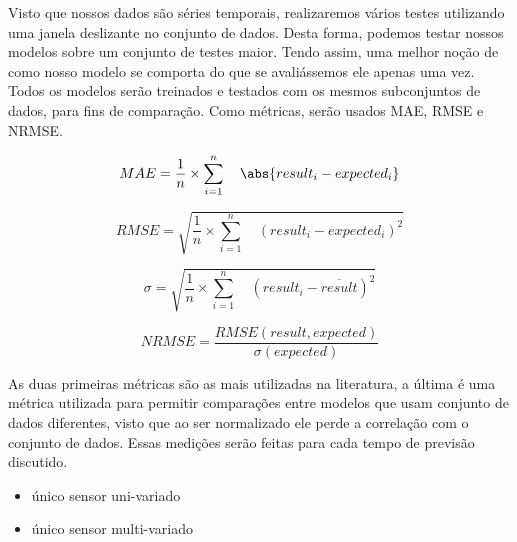 



Visto que nossos dados são séries temporais, realizaremos vários testes utilizando uma janela deslizante no conjunto de dados. Desta forma, podemos testar nossos modelos sobre um conjunto de testes maior. Tendo assim, uma melhor noção de como nosso modelo se comporta do que se avaliássemos ele apenas uma vez. Todos os modelos serão treinados e testados com os mesmos subconjuntos de dados, para fins de comparação. Como métricas, serão usados MAE, RMSE e NRMSE. 

\begin{equation}
MAE = \frac{1}{n} \times \sum_{i=1}^{n} \quad \abs{result_i - expected_i}
\end{equation}

\begin{equation}
RMSE = \sqrt{ \frac{1}{n} \times \sum_{i=1}^{n} \quad (result_i - expected_i) ^ 2}
\end{equation}

\begin{equation}
\sigma = \sqrt{ \frac{1}{n} \times \sum_{i=1}^{n} \quad (result_i - \overline{result}) ^ 2}
\end{equation}

\begin{equation}
NRMSE = \frac{RMSE(result, expected)}{\sigma(expected)}
\end{equation}

As duas primeiras métricas são as mais utilizadas na literatura, a última é uma métrica utilizada para permitir comparações entre modelos que usam conjunto de dados diferentes, visto que ao ser normalizado ele perde a correlação com o conjunto de dados. Essas medições serão feitas para cada tempo de previsão discutido.

\begin{itemize}
    \item único sensor uni-variado
    \item único sensor multi-variado
\end{itemize}



